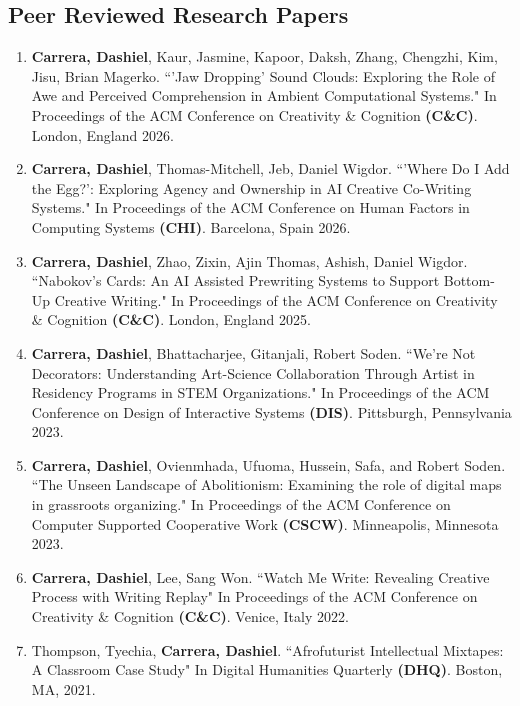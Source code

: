 
\subsection{Peer Reviewed Research Papers}
 \begin{enumerate}
 
       \item \textbf{Carrera, Dashiel}, Kaur, Jasmine, Kapoor, Daksh, Zhang, Chengzhi, Kim, Jisu, Brian Magerko. ``'Jaw Dropping' Sound Clouds: Exploring the Role of Awe and Perceived Comprehension in Ambient Computational Systems." In Proceedings of the ACM Conference on Creativity \& Cognition \textbf{(C\&C)}. London, England 2026.  \\
 
     \item \textbf{Carrera, Dashiel}, Thomas-Mitchell, Jeb, Daniel Wigdor. ``'Where Do I Add the Egg?': Exploring Agency and Ownership in AI Creative Co-Writing Systems." In Proceedings of the ACM Conference on Human Factors in Computing Systems \textbf{(CHI)}. Barcelona, Spain 2026.\\
 
  
  \item \textbf{Carrera, Dashiel}, Zhao, Zixin, Ajin Thomas, Ashish, Daniel Wigdor. ``Nabokov's Cards: An AI Assisted Prewriting Systems to Support Bottom-Up Creative Writing." In Proceedings of the ACM Conference on Creativity \& Cognition \textbf{(C\&C)}. London, England 2025. \\
  \item \textbf{Carrera, Dashiel}, Bhattacharjee, Gitanjali, Robert Soden. ``We're Not Decorators: Understanding Art-Science Collaboration Through Artist in Residency Programs in STEM Organizations." In Proceedings of the ACM Conference on Design of Interactive Systems \textbf{(DIS)}. Pittsburgh, Pennsylvania 2023. \\
  \item \textbf{Carrera, Dashiel}, Ovienmhada, Ufuoma, Hussein, Safa, and Robert Soden. ``The Unseen Landscape of Abolitionism: Examining the role of digital maps in
grassroots organizing."   In Proceedings of the ACM Conference on Computer Supported Cooperative Work \textbf{(CSCW)}. Minneapolis, Minnesota 2023.\\
  \item \textbf{Carrera, Dashiel}, Lee, Sang Won. ``Watch Me Write: Revealing Creative Process with Writing Replay" In Proceedings of the ACM Conference on Creativity \& Cognition \textbf{(C\&C)}. Venice, Italy 2022. \\
  \item Thompson, Tyechia, \textbf{Carrera, Dashiel}. ``Afrofuturist Intellectual Mixtapes: A Classroom Case Study" In Digital Humanities Quarterly \textbf{(DHQ)}. Boston, MA, 2021.\
 \end{enumerate}
 
